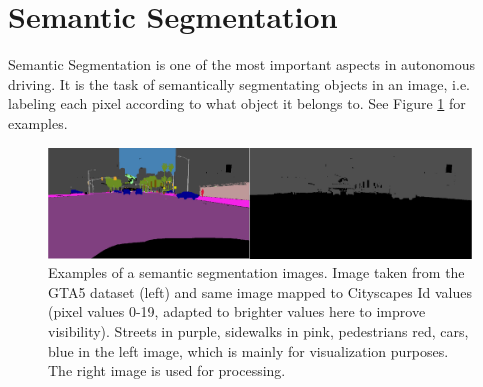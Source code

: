 \section{Semantic Segmentation}
Semantic Segmentation is one of the most important aspects in autonomous driving. It is the task of semantically segmentating objects in an image, i.e. labeling each pixel according to what object it belongs to. See Figure \ref{fig:semseg} for examples.

\begin{figure}
	\centering
	\includegraphics[width=\textwidth]{../images/semseg.png}
	\caption{Examples of a semantic segmentation images. Image taken from the GTA5 dataset \cite{Richter_2016_ECCV} (left) and same image mapped to Cityscapes Id values (pixel values 0-19, adapted to brighter values here to improve visibility). Streets in purple, sidewalks in pink, pedestrians red, cars, blue in the left image, which is mainly for visualization purposes. The right image is used for processing.}
	\label{fig:semseg}
\end{figure}



